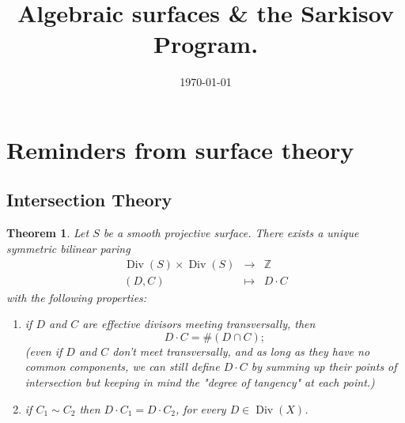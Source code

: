 \documentclass[a4paper,11pt]{amsart}
\title{Algebraic surfaces \& the Sarkisov Program.}
\author{}
\date{\today}
\newtheorem{theorem}{Theorem}[section]
\def\Div{\operatorname{Div}}
\def\Cr{\operatorname{Cr}}
\newcommand{\ZZ}{\mathbb{Z}}
\newcommand{\CC}{\mathbb{C}}
\begin{document}

\maketitle

\tableofcontents

\section{Reminders from surface theory}


\subsection{Intersection Theory}

\begin{theorem}
	Let $S$ be a smooth projective surface.
	There exists a unique symmetric bilinear paring 
	\[
	\begin{array}{ccc}
		\Div(S) \times \Div(S) & \to & \ZZ\\
		(D,C) 	& \mapsto & D\cdot C
	\end{array}
	\]
	with the following properties:
	\begin{enumerate}
		\item\label{it:inters1} if $D$ and $C$ are effective divisors meeting transversally, then 
		\[
		D\cdot C = \#(D \cap C);
		\]
		{\small (even if $D$ and $C$ don't meet transversally, and as long as they have no common components, we can still define $D\cdot C$ by summing up their points of intersection but keeping in mind the \emph{"degree of tangency"} at each point.)}
		\item\label{it:inters2} if $C_1 \sim C_2$ then $D\cdot C_1 = D\cdot C_2$, for every $D \in \Div(X)$.
	\end{enumerate}
\end{theorem}
\end{document}
